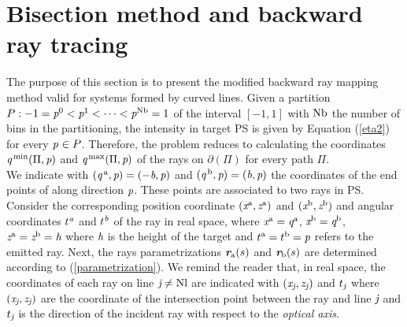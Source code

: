 \section{Bisection method and backward ray tracing}\label{sec:raymapping_explanation}
The purpose of this section is to present the modified backward ray mapping method valid for systems formed by curved lines. 
Given a partition $P: -1 = \textit{p}^0<\textit{p}^1<\cdots<\textit{p}^{\textrm{Nb}}=1$ of the interval $[-1,1]$ with $\textrm{Nb}$ the number of bins in the partitioning, the intensity in target PS is given by Equation (\ref{eta2}) for every $\textit{p}_{\textrm{} \textit{}}\in P$.
Therefore, the problem reduces to calculating the coordinates 
$\textit{q}^{\textrm{\,min}}(\Pi, \textit{p})$ and $\textit{q}^{\textrm{\,max}}(\Pi, \textit{p})$ of the rays on $\partial$$(\Pi)$ for every path $\Pi$. 
\\ \indent 
We indicate with $(\textit{q}^{\,\textrm{a}}, \textit{p})= (-\textit{b}, \textit{p})$ and $(\textit{q}^{\,\textrm{b}}, \textit{p}) = (\textit{b}, \textit{p})$ the coordinates of the end points of  along direction $\textit{p}$. These points are associated to two rays in PS. Consider the corresponding position coordinate $(\textit{x}^{\textrm{a}}, \textit{z}^{\textrm{a}})$ and $(\textit{x}^{\textrm{b}}, \textit{z}^{\textrm{b}})$ and angular coordinates $t^{\textit{a}}$ and $t^{\textit{b}}$ of the ray in real space, where $\textit{x}^{\textrm{a}} = \textit{q}^{\textrm{a}}$, $\textit{x}^{\textrm{b}} = \textit{q}^{\textrm{b}}$, $\textit{z}^{\textrm{a}} = \textit{z}^{\textrm{b}} = \textit{h}$ where $\textit{h}$ is the height of the target and $t^{\textrm{a}}= t^{\textrm{b}}=\textit{p}$ refers to the emitted ray. Next, the rays parametrizations $\textit{\textbf{r}}_{\textrm{a}}(s)$ and $\textit{\textbf{r}}_{\textrm{b}}(s)$ are determined according to (\ref{parametrization}).
We remind the reader that, in real space, the coordinates of each ray on line $\textit{j}\neq \textrm{Nl}$ are indicated with $(\textit{x}_{\textit{j}}, \textit{z}_{\textit{j}})$ and $t_{\textit{j}}$ where $(\textit{x}_{\textit{j}}, \textit{z}_{\textit{j}})$ are the coordinate of the intersection point between the ray and line $\textit{j}$ and $t_{\textit{j}}$ is the direction of the incident ray with respect to the \textit{optical axis}. 
